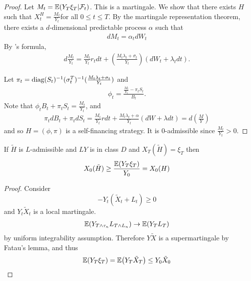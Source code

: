 \begin{proof}
  Let $M_{t} = \E{Y_{T} \xi_{T} | \mathcal{F}_{t}}$.  This is a
  martingale.  We show that there exists $H$ such that $X_{t}^{H} =
  \frac{M_{t}}{Y_{t}}$for all $0 \leq t \leq T$.  By the martingale
  representation theorem, there exists a $d$-dimensional predictable
  process $\alpha$ such that
  \begin{align}
    \label{eq:78}
    dM_{t} = \alpha_{t} dW_{t}
  \end{align}  By \ito's formula,
  \begin{align}
    \label{eq:79}
    d \frac{M_{t}}{Y_{t}} = \frac{M_{t}}{Y_{t}} r_{t} dt + (
    \frac{M_{t} \lambda_{t} + \sigma_{t}}{Y_{t}}) (dW_{t} +
    \lambda_{t} dt).
  \end{align}

  Let $\pi_{t} = \operatorname*{diag} (S_{t})^{-1} (\sigma_{t}^{T})^{-1} (\frac{M_{t}
    \lambda_{t} + \sigma_{t}}{Y_{t}})$ and
  \begin{align}
    \label{eq:81}
    \phi_{t} = \frac{\frac{M_{t}}{Y_{t}} - \pi_{t} S_{t}}{B_{t}}.
  \end{align}  Note that $\phi_{t} B_{t} + \pi_{t} S_{t} =
  \frac{M_{t}}{Y_{t}}$, and
  \begin{align}
    \label{eq:82}
    \pi_{t} dB_{t} + \pi_{t} dS_{t} = \frac{M_{t}}{Y_{t}} r dt +
    \frac{M_{t} \lambda_{t} + \alpha}{Y_{t}} (dW  +\lambda dt) = d(\frac{M}{Y})
  \end{align} and so $H = (\phi, \pi)$ is a self-financing strategy.
  It is 0-admissible since $\frac{M_{t}}{Y_{t}} > 0$.
\end{proof}

\begin{thm}
  \label{defn:continuous_time:33}
  If $\tilde H$ is $L$-admissible and $LY$ is in class $D$ and
  $X_{T}(\tilde H) = \xi_{T}$ then
  \begin{align}
    \label{eq:80}
    X_{0}(\tilde H) \geq \frac{\E{Y_{T} \xi_{T}}}{Y_{0}}= X_{0}(H)
  \end{align}
\end{thm}

\begin{proof}
  Consider
  \begin{equation}
    \label{eq:83}
    -Y_{t}(\tilde X_{t} + L_{t}) \geq 0
  \end{equation} and $Y_{t} \tilde X_{t}$ is a local martingale.
  \begin{align}
    \label{eq:84}
    \E{Y_{T \wedge \tau_{n}} L_{T \wedge L_{n}}} \rightarrow \E{Y_{T}
      L_{T}}
  \end{align} by uniform integrability assumption. Therefore $Y \tilde
  X$ is a supermartingale by Fatau's lemma, and thus
  \begin{align}
    \label{eq:85}
    \E{Y_{T}\xi_{T}} = \E{Y_{T} \tilde X_{T}} \leq Y_{0} \tilde X_{0}
  \end{align}
\end{proof}

